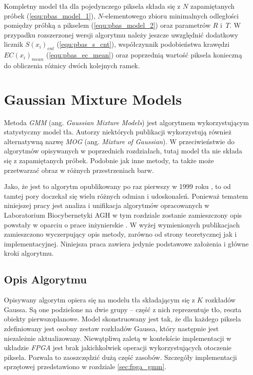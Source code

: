 Kompletny model tła dla pojedynczego piksela składa się z $N$ zapamiętanych próbek (\ref{equ:pbas_model_1}), $N$-elementowego zbioru minimalnych odległości pomiędzy próbką a pikselem (\ref{equ:pbas_model_2}) oraz parametrów $R$ i~$T$. W przypadku rozszerzonej wersji algorytmu należy jeszcze uwzględnić dodatkowy licznik $S(x_i)_{cnt}$ (\ref{equ:pbas_s_cnt}), współczynnik podobieństwa krawędzi $EC(x_i)_{mean}$ (\ref{equ:pbas_ec_mean}) oraz poprzednią wartość piksela konieczną do obliczenia różnicy dwóch kolejnych ramek.


\section{Gaussian Mixture Models}
\label{sec:gmm_teoria}

Metoda \textit{GMM} (ang. \textit{Gaussian Mixture Models}) jest algorytmem wykorzystującym statystyczny model tła. Autorzy niektórych publikacji wykorzystują również alternatywną nazwę \textit{MOG} (ang. \textit{Mixture of Gaussian}). 
W przeciwieństwie do algorytmów opisywanych w poprzednich rozdziałach, tutaj model tła nie składa się z zapamiętanych próbek. 
Podobnie jak inne metody, ta także może przetwarzać obraz w różnych przestrzeniach barw. 

Jako, że jest to algorytm opublikowany po raz pierwszy w 1999 roku \cite{Stauffer_Grimson_99}, to od tamtej pory doczekał się wielu różnych odmian i udoskonaleń. 
Ponieważ tematem niniejszej pracy jest analiza i unifikacja algorytmów opracowanych w Laboratorium Biocybernetyki AGH w tym rozdziale zostanie zamieszczony opis powstały w oparciu o prace inżynierskie \cite{janus_15, piszczek_15}. W wyżej wymienionych publikacjach zamieszczono wyczerpujący opis metody, zarówno od strony teoretycznej jak i implementacyjnej. Niniejsza praca zawiera jedynie podstawowe założenia i główne kroki algorytmu.


\subsection{Opis Algorytmu}
\label{subsec:gmm_opis}


Opisywany algorytm opiera się na modelu tła składającym się z $K$ rozkładów Gaussa. 
Są one podzielone na dwie grupy -- część z nich reprezentuje tło, reszta obiekty pierwszoplanowe. 
Model skonstruowany jest tak, że dla każdego piksela zdefiniowany jest osobny zestaw rozkładów Gaussa, który następnie jest niezależnie aktualizowany. 
Niewątpliwą zaletą w kontekście implementacji w układzie \textit{FPGA} jest brak jakichkolwiek operacji wykorzystujących otoczenie piksela. 
Pozwala to zaoszczędzić dużą część zasobów. 
Szczegóły implementacji sprzętowej przedstawiono w rozdziale \ref{sec:fpga_gmm}.

